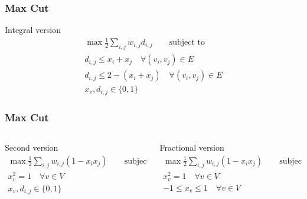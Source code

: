 \documentclass[12pt,aspectratio=169]{beamer}
\begin{document}
\begin{frame}\frametitle{Max Cut}
  \begin{block}{Integral version}
  \begin{equation}
    \begin{split}
      \max \frac{1}{2}\sum_{i,j} w_{i,j}d_{i,j}\qquad\text{subject to}\\
      d_{i,j} \le x_{i} + x_{j} \quad \forall (v_{i}, v_{j})\in E\\
      d_{i,j} \le 2 - \left(x_{i} + x_{j}\right) \quad \forall (v_{i}, v_{j})\in E\\
      x_{v}, d_{i,j}\in \{0,1\}
     \end{split}
   \end{equation}
 \end{block}
\end{frame}

\begin{frame}\frametitle{Max Cut}
\begin{columns} 
  \begin{column}{0.48\textwidth}
  \begin{block}{Second version}
  \begin{equation}
    \begin{split}
      \max \frac{1}{2}\sum_{i,j} w_{i,j}(1 - x_{i}x_{j})\qquad\text{subject to}\\
      x_{v}^{2} =1\quad \forall v\in V\\
      x_{v}, d_{i,j}\in \{0,1\}
     \end{split}
   \end{equation}
 \end{block}
\end{column}
  \begin{column}{0.48\textwidth}
\begin{block}{Fractional version}
  \begin{equation}
    \begin{split}
      \max \frac{1}{2}\sum_{i,j} w_{i,j}(1 - x_{i}x_{j})\qquad\text{subject to}\\
      x_{v}^{2} =1\quad \forall v\in V\\
      -1\le x_{v}\le  1\quad \forall v\in V
     \end{split}
   \end{equation}
 \end{block}
\end{column}
\end{columns}
\end{frame}
\end{document}
